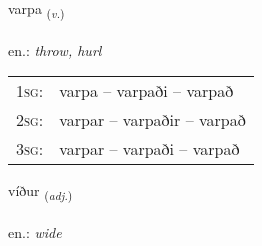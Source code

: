 \documentclass[frontgrid, backgrid]{flacards}\usepackage[]{graphicx}\usepackage[]{xcolor}
\begin{document}
\renewcommand{\flhead}{\vskip5pt \fboxsep=0pt {\small\bfseries\footnotesize Sagnorð | Verb}}
\renewcommand{\fcfoot}{\vskip5pt \fboxsep=0pt \hspace{2pt}{\small\bfseries\footnotesize 2K}}

\renewcommand{\blhead}{\vskip5pt {\small\bfseries\footnotesize Sagnorð | Verb }}
\renewcommand{\bcfoot}{\vskip5pt \hspace{2pt}{\small\bfseries\footnotesize 2K}}


{varpa \small{\textsubscript{(\textit{v.})}} \\[1ex] %
\textphonetic{[var̥pa]} \\
en.: \emph{throw, hurl} \\  [2ex]
\renewcommand*{\arraystretch}{0.8}
\begin{tabular}{p{1cm}l}
\textsc{1sg}: & varpa -- varpaði -- varpað \\ 
\textsc{2sg}: & varpar -- varpaðir -- varpað \\ 
\textsc{3sg}: & varpar -- varpaði -- varpað \\ 
\end{tabular}
}

\renewcommand{\flhead}{\vskip5pt \fboxsep=0pt {\small\bfseries\footnotesize Lýsingarorð | Adjective}}
\renewcommand{\fcfoot}{\vskip5pt \fboxsep=0pt \hspace{2pt}{\small\bfseries\footnotesize 2K}}

\renewcommand{\blhead}{\vskip5pt {\small\bfseries\footnotesize Lýsingarorð | Adjective }}
\renewcommand{\bcfoot}{\vskip5pt \hspace{2pt}{\small\bfseries\footnotesize 2K}}


{víður \small{\textsubscript{(\textit{adj.})}} \\[1ex] %
\textphonetic{[viːðʏr]} \\
en.: \emph{wide} \\  [2ex]
\renewcommand*{\arraystretch}{0.8}
}
\end{document}
